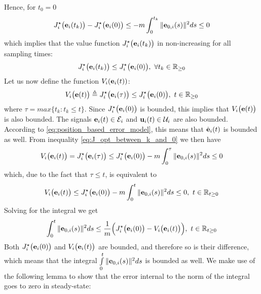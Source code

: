 Hence, for $t_0 = 0$
\begin{align}
  J_i^{\star}\big(\bm{\mathbf{e}}_i(t_{k})\big) - J_i^{\star}\big(\bm{\mathbf{e}}_i(0)\big) \leq
    -m \int_{0}^{t_{k}} \|\bm{\mathbf{e}}_{0,i}(s)\|^2 ds \leq 0
\label{eq:J_opt_between_k_and_0}
\end{align}
which implies that the value function $J_i^{\star}\big(\bm{\mathbf{e}}_i(t_{k})\big)$
in non-increasing for all sampling times:
\begin{align}
  J_i^{\star}\big(\bm{\mathbf{e}}_i(t_{k})\big) \leq J_i^{\star}\big(\bm{\mathbf{e}}_i(0)\big),\ \forall t_k \in \mathbb{R}_{\geq0}
\end{align}
Let us now define the function $V_i(\bm{\mathbf{e}}_i(t))$:
\begin{align}
  V_i\big(\bm{\mathbf{e}}(t)\big) \triangleq J_i^{\star}\big(\bm{\mathbf{e}}_i(\tau)\big) \leq J_i^{\star}\big(\bm{\mathbf{e}}_i(0)\big),\ t \in \mathbb{R}_{\geq0}
\end{align}
where $\tau = max\{t_k : t_k \leq t\}$. Since $J_i^{\star}\big(\bm{\mathbf{e}}_i(0)\big)$
is bounded, this implies that $V_i\big(\bm{\mathbf{e}}(t)\big)$ is also bounded. The
signals $\bm{\mathbf{e}}_i(t) \in \mathcal{E}_i$ and $\bm{\mathbf{u}}_i(t) \in \mathcal{U}_i$
are also bounded. According to \eqref{eq:position_based_error_model}, this
means that $\dot{\bm{\mathbf{e}}}_i(t)$ is bounded as well. From inequality
\eqref{eq:J_opt_between_k_and_0} we then have
\begin{align}
  V_i\big(\bm{\mathbf{e}}_i(t)\big) = J_i^{\star}\big(\bm{\mathbf{e}}_i(\tau)\big) \leq J_i^{\star}\big(\bm{\mathbf{e}}_i(0)\big)
    -m \int_{0}^{\tau} \|\bm{\mathbf{e}}_{0,i}(s)\|^2 ds \leq 0
\end{align}
which, due to the fact that $\tau \leq t$, is equivalent to
\begin{align}
  V_i\big(\bm{\mathbf{e}}_i(t)\big) \leq J_i^{\star}\big(\bm{\mathbf{e}}_i(0)\big) -m \int_{0}^{t} \|\bm{\mathbf{e}}_{0,i}(s)\|^2 ds \leq 0,\ t \in \mathbb{R}_{t\geq 0}
\end{align}
Solving for the integral we get
\begin{align}
  \int_{0}^{t} \|\bm{\mathbf{e}}_{0,i}(s)\|^2 ds \leq
    \dfrac{1}{m}\Big(J_i^{\star}\big(\bm{\mathbf{e}}_i(0)\big) - V_i\big(\bm{\mathbf{e}}_i(t)\big)\Big),\ t \in \mathbb{R}_{t\geq 0}
\end{align}
Both $J_i^{\star}\big(\bm{\mathbf{e}}_i(0)\big)$ and $V_i\big(\bm{\mathbf{e}}_i(t)\big)$
are bounded, and therefore so is their difference, which means that the
integral $\int\limits_{0}^{t} \|\bm{\mathbf{e}}_{0,i}(s)\|^2 ds$ is bounded as well.
We make use of the following lemma to show that the error internal to the
norm of the integral goes to zero in steady-state:

